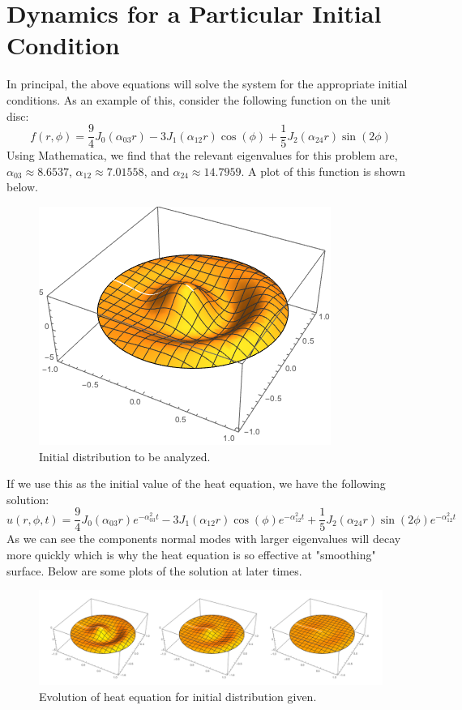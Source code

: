 \documentclass{article}
\begin{document}
\section{Dynamics for a Particular Initial Condition}
In principal, the above equations will solve the system for the appropriate initial conditions. As an example of this, consider the following function on the unit disc:
\begin{equation}
  f(r,\phi)=\frac{9}{4}J_0(\alpha_{03}r)-3 J_1(\alpha_{12}r)\cos(\phi)+\frac{1}{5} J_2(\alpha_{24}r)\sin(2\phi)
\end{equation}
Using Mathematica, we find that the relevant eigenvalues for this problem are, $\alpha_{03}\approx8.6537$, $\alpha_{12}\approx 7.01558$, and $\alpha_{24}\approx 14.7959$. A plot of this function is shown below.\\
\begin{figure}[H]
  \centering
  \includegraphics[width = 4.5 cm]{images/initialvalue.png}
  \caption{Initial distribution to be analyzed.}
\end{figure}
If we use this as the initial value of the heat equation, we have the following solution:
\begin{equation}
  u(r,\phi,t)=\frac{9}{4}J_0(\alpha_{03}r)e^{-\alpha_{03}^2 t}-3 J_1(\alpha_{12}r)\cos(\phi)e^{-\alpha_{12}^2 t}+\frac{1}{5} J_2(\alpha_{24}r)\sin(2\phi)e^{-\alpha_{12}^2 t}
\end{equation}
As we can see the components normal modes with larger eigenvalues will decay more quickly which is why the heat equation is so effective at "smoothing" surface. Below are some plots of the solution at later times.
\begin{figure}[H]
  \centering
  \includegraphics[width = 1.0\textwidth]{images/heat.png}
  \caption{Evolution of heat equation for initial distribution given.}
\end{figure}
\end{document}
